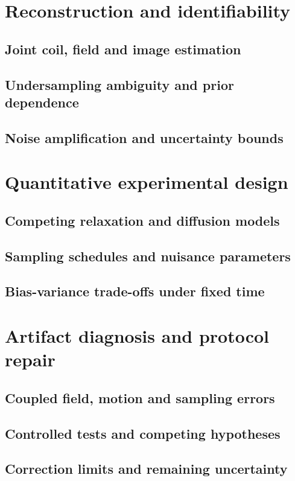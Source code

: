 \section{Reconstruction and identifiability}
\label{sec:27:reconstruction-and-identifiability}
\subsection{Joint coil, field and image estimation}
\subsection{Undersampling ambiguity and prior dependence}
\subsection{Noise amplification and uncertainty bounds}

\section{Quantitative experimental design}
\label{sec:27:quantitative-experimental-design}
\subsection{Competing relaxation and diffusion models}
\subsection{Sampling schedules and nuisance parameters}
\subsection{Bias-variance trade-offs under fixed time}

\section{Artifact diagnosis and protocol repair}
\label{sec:27:artifact-diagnosis-and-protocol-repair}
\subsection{Coupled field, motion and sampling errors}
\subsection{Controlled tests and competing hypotheses}
\subsection{Correction limits and remaining uncertainty}

